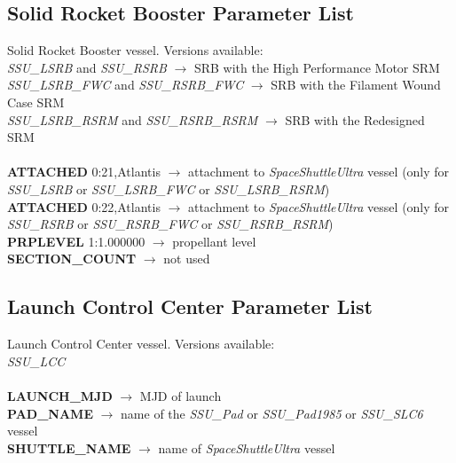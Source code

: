 \documentclass[Space_Shuttle_Ultra_Manual.tex]{subfiles}
\begin{document}
\begin{multicols*}{2}
\subsection{Solid Rocket Booster Parameter List}
\noindent
Solid Rocket Booster vessel. Versions available:
\\
\textit{SSU\_LSRB} and \textit{SSU\_RSRB} $\rightarrow$ SRB with the High Performance Motor SRM
\\
\textit{SSU\_LSRB\_FWC} and \textit{SSU\_RSRB\_FWC} $\rightarrow$ SRB with the Filament Wound Case SRM
\\
\textit{SSU\_LSRB\_RSRM} and \textit{SSU\_RSRB\_RSRM} $\rightarrow$ SRB with the Redesigned SRM
\\
\\
\textbf{ATTACHED} 0:21,Atlantis $\rightarrow$ attachment to \textit{SpaceShuttleUltra} vessel (only for \textit{SSU\_LSRB} or \textit{SSU\_LSRB\_FWC} or \textit{SSU\_LSRB\_RSRM})
\\
\textbf{ATTACHED} 0:22,Atlantis $\rightarrow$ attachment to \textit{SpaceShuttleUltra} vessel (only for \textit{SSU\_RSRB} or \textit{SSU\_RSRB\_FWC} or \textit{SSU\_RSRB\_RSRM})
\\
\textbf{PRPLEVEL} 1:1.000000 $\rightarrow$ propellant level
\\
\textbf{SECTION\_COUNT} $\rightarrow$ not used
\\

\subsection{Launch Control Center Parameter List}
\noindent
Launch Control Center vessel. Versions available:
\\
\textit{SSU\_LCC}
\\
\\
\textbf{LAUNCH\_MJD} $\rightarrow$ MJD of launch
\\
\textbf{PAD\_NAME} $\rightarrow$ name of the \textit{SSU\_Pad} or \textit{SSU\_Pad1985} or \textit{SSU\_SLC6} vessel
\\
\textbf{SHUTTLE\_NAME} $\rightarrow$ name of \textit{SpaceShuttleUltra} vessel
\\


\end{multicols*}
\end{document}
